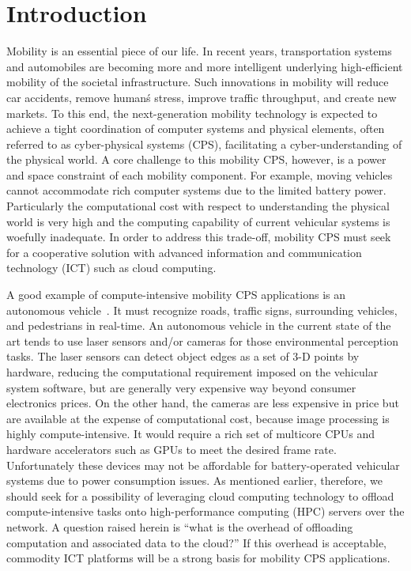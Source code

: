 \section{Introduction}
\label{sec:introduction}

Mobility is an essential piece of our life.
In recent years, transportation systems and automobiles are becoming
more and more intelligent underlying high-efficient mobility of the
societal infrastructure.
Such innovations in mobility will reduce car accidents, remove human\'s
stress, improve traffic throughput, and create new markets.
To this end, the next-generation mobility technology is expected to
achieve a tight coordination of computer systems and physical elements,
often referred to as cyber-physical systems (CPS), facilitating a
cyber-understanding of the physical world.
A core challenge to this mobility CPS, however, is a power and space
constraint of each mobility component.
For example, moving vehicles cannot accommodate rich computer systems
due to the limited battery power.
Particularly the computational cost with respect to understanding the
physical world is very high and the computing capability of current
vehicular systems is woefully inadequate.
In order to address this trade-off, mobility CPS must seek for a
cooperative solution with advanced information and communication
technology (ICT) such as cloud computing.

A good example of compute-intensive mobility CPS applications is an
autonomous vehicle~\cite{Guizzo11, Levinson11, Urmson08}.
It must recognize roads, traffic signs, surrounding vehicles, and
pedestrians in real-time.
An autonomous vehicle in the current state of the art tends to use laser
sensors and/or cameras for those environmental perception tasks.
The laser sensors can detect object edges as a set of 3-D points by
hardware, reducing the computational requirement imposed on the
vehicular system software, but are generally very expensive way beyond
consumer electronics prices.
On the other hand, the cameras are less expensive in price but are
available at the expense of computational cost, because image processing
is highly compute-intensive.
It would require a rich set of multicore CPUs and hardware accelerators
such as GPUs to meet the desired frame rate.
Unfortunately these devices may not be affordable for battery-operated
vehicular systems due to power consumption issues.
As mentioned earlier, therefore, we should seek for a possibility of
leveraging cloud computing technology to offload compute-intensive tasks
onto high-performance computing (HPC) servers over the network.
A question raised herein is ``what is the overhead of offloading
computation and associated data to the cloud?''
If this overhead is acceptable, commodity ICT platforms will be a strong
basis for mobility CPS applications.

